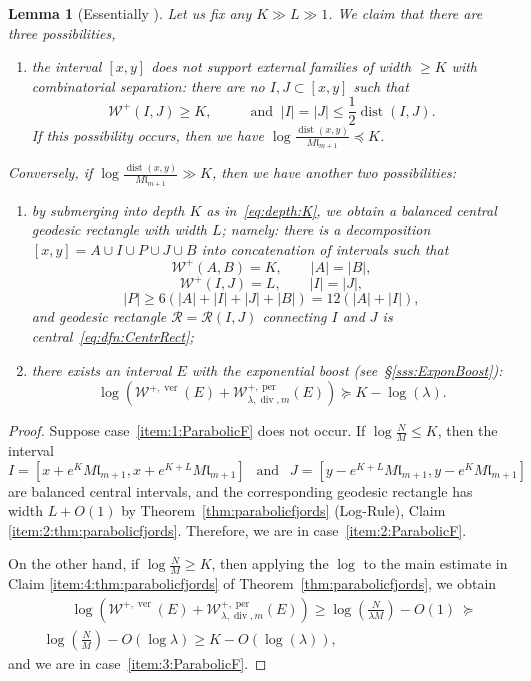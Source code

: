 \documentclass{amsart}
\renewcommand{\sp}{{\ \ }}
\newcommand{\1}{{\mathbb 1 }}
\renewcommand{\div}{{\operatorname{div}}}
\newcommand{\Width}{{\mathcal W}}
\newcommand\RR{\mathcal{R}}
\newcommand{\length}{{\mathfrak l}}
\newcommand\ver{{\operatorname{ver}}}
\newcommand\per{{\operatorname{per}}}
\newtheorem{lem}[thm]{Lemma}
\theoremstyle{remark}
\numberwithin{equation}{section}
\theoremstyle{definition}
\newcommand{\dist}{\operatorname{dist}}
\begin{document}
\begin{lem}[Essentially {\cite[Lemma 4.12]{DL22}}]
\label{thm:center:rect}
Let us fix any $K\gg L \gg 1$. We claim that there are three possibilities, 
\begin{enumerate}[label=(\alph*)]
    \item\label{item:1:ParabolicF} the interval $[x,y]$ does not support external families of width $\geq K$ with combinatorial separation: there are no $I, J \subset [x,y]$ such that
    \[\Width^+(I,J)\ge K, \hspace{1cm} \text{ and }\ |I|=|J|\le \frac 12\dist(I,J).\]
    If this possibility occurs, then we have $\log \frac{\dist(x,y)}{M\length_{m+1}}\preceq K$.
\end{enumerate}
Conversely, if $\log \frac{\dist(x,y)}{M\length_{m+1}}\gg K$, then we have another two possibilities: 
\begin{enumerate}[label=(\alph*),start=2]
    \item\label{item:2:ParabolicF} 
      by submerging into depth $K$ as in~\eqref{eq:depth:K}, we obtain a balanced central geodesic rectangle with width $L$; namely: there is a decomposition $[x,y]=A\cup I \cup P \cup J \cup B$ into concatenation of intervals such that 
      \[\Width^+(A,B)=K, \qquad |A|=|B|,\]
      \[\Width^+(I,J)=L, \qquad |I|=|J|,\]
     \[|P|\ge 6(|A|+|I|+|J|+|B|)=12(|A|+|I|),\]
     and geodesic rectangle $\RR=\RR(I,J)$ connecting $I$ and $J$ is central~\eqref{eq:dfn:CentrRect}; 
    \item\label{item:3:ParabolicF} there exists an interval $E$ with the exponential boost (see~\S\ref{sss:ExponBoost}): \[\log \left(\Width^{+,\ver}(E)+\Width^{+,\per}_{\lambda,\div, m}(E)\right)\succeq K - \log(\lambda).\]
\end{enumerate}
\end{lem}
\begin{proof}
Suppose case~\ref{item:1:ParabolicF} does not occur.
If $\log \frac{N}{M} \le K$, then the interval \[I = [x+e^K M\length_{m+1}, x+e^{K+L}M\length_{m+1}] \sp \text{ and } \sp J= [y-e^{K+L}M\length_{m+1}, y-e^KM\length_{m+1}]\] are balanced central intervals, and the corresponding geodesic rectangle has width $ L+O(1)$ by Theorem~\ref{thm:parabolicfjords} (Log-Rule), Claim  \ref{item:2:thm:parabolicfjords}.
Therefore, we are in case~\ref{item:2:ParabolicF}.


On the other hand, if $\log \frac{N}{M} \ge K$, then applying the $\log$ to the main estimate in Claim \ref{item:4:thm:parabolicfjords} of Theorem~\ref{thm:parabolicfjords}, we obtain 
\begin{multline*}    
\qquad \log \left(\Width^{+,\ver}(E)+\Width^{+,\per}_{\lambda,\div, m}(E)\right)\ge  \log \left(\frac{N}{\lambda M}\right)-O(1)\ \succeq \\ \log\left(\frac{N}{ M}\right)-O(\log \lambda)\ge  K -O( \log(\lambda)),\qquad\end{multline*}    
 and we are in case~\ref{item:3:ParabolicF}.
\end{proof}
\end{document}
